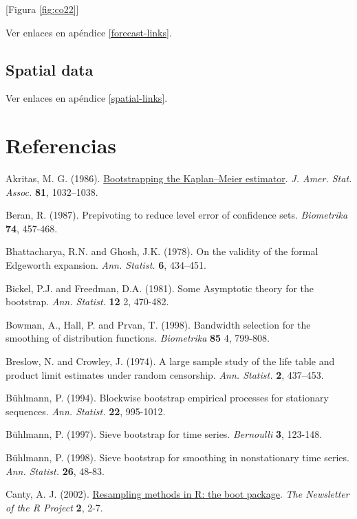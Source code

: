 \documentclass[
]{book}
\theoremstyle{definition}
\theoremstyle{definition}
\theoremstyle{definition}
\theoremstyle{remark}
\begin{document}
{[}Figura \ref{fig:co22}{]}

Ver enlaces en apéndice \ref{forecast-links}.

\hypertarget{spatial-data}{%
\section{Spatial data}\label{spatial-data}}

Ver enlaces en apéndice \ref{spatial-links}.

\hypertarget{referencias}{%
\chapter*{Referencias}\label{referencias}}

Akritas, M. G. (1986). \href{https://www.tandfonline.com/doi/abs/10.1080/01621459.1986.10478369}{Bootstrapping the Kaplan--Meier estimator}.
\emph{J. Amer. Stat. Assoc.} \textbf{81}, 1032--1038.

Beran, R. (1987). Prepivoting to reduce level error of confidence sets.
\emph{Biometrika} \textbf{74}, 457-468.

Bhattacharya, R.N. and Ghosh, J.K. (1978). On the validity of the formal
Edgeworth expansion. \emph{Ann. Statist.} \textbf{6}, 434--451.

Bickel, P.J. and Freedman, D.A. (1981). Some Asymptotic theory for the
bootstrap. \emph{Ann. Statist.} \textbf{12} 2, 470-482.

Bowman, A., Hall, P. and Prvan, T. (1998). Bandwidth selection for the
smoothing of distribution functions. \emph{Biometrika} \textbf{85} 4, 799-808.

Breslow, N. and Crowley, J. (1974). A large sample study of the life
table and product limit estimates under random censorship. \emph{Ann.
Statist.} \textbf{2}, 437--453.

Bühlmann, P. (1994). Blockwise bootstrap empirical processes for
stationary sequences. \emph{Ann. Statist.} \textbf{22}, 995-1012.

Bühlmann, P. (1997). Sieve bootstrap for time series. \emph{Bernoulli} \textbf{3},
123-148.

Bühlmann, P. (1998). Sieve bootstrap for smoothing in nonstationary time
series. \emph{Ann. Statist.} \textbf{26}, 48-83.

Canty, A. J. (2002). \href{http://cran.fhcrc.org/doc/Rnews/Rnews_2002-3.pdf}{Resampling methods in R: the boot package}.
\emph{The Newsletter of the R Project} \textbf{2}, 2-7.
\end{document}
